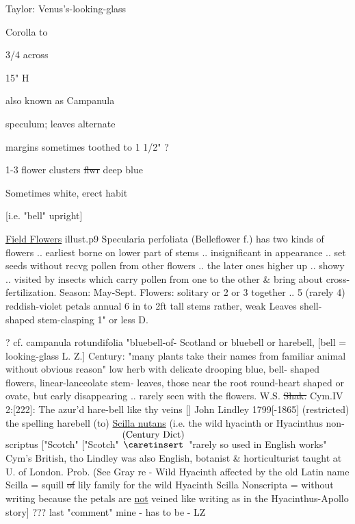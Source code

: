 \documentclass[a4paper]{article}
\begin{document}
\begin{minipage}[t]{0.6\textwidth}
Taylor: Venus's-looking-glass\par
Corolla to\par
3/4 across\par
15" H\par


also known as Campanula\par
speculum; leaves alternate\par
margins sometimes toothed to 1 1/2" ?\par
1-3 flower clusters \sout{flwr} deep blue\par
Sometimes white, erect habit\par
{[i.e. "bell" upright]}\par
\ul{Field Flowers} illust.p9 Specularia
perfoliata (Belleflower
f.)
has two kinds of flowers .. earliest
borne on lower part of stems .. insignificant
in appearance .. set seeds without recvg
pollen from other flowers .. the later ones
higher up .. showy .. visited by insects
which carry pollen from one to the other \& bring
about cross-fertilization. Season:
May-Sept. Flowers: solitary or 2 or 3
together .. 5 (rarely 4) reddish-violet petals
annual 6 in to 2ft tall stems rather,
weak Leaves shell-shaped stem-clasping
1" or less D.\par 
\color{red}
? cf. campanula rotundifolia "bluebell-of-
Scotland or bluebell or harebell,
[bell = looking-glass L. Z.] Century:
"many plants take their names from
familiar animal %
without obvious reason"
low herb with delicate drooping blue, bell-
shaped flowers, linear-lanceolate stem-
leaves, those near the root round-heart
shaped or ovate, but early disappearing
.. rarely seen with the flowers.
W.S. \sout{Shak.} Cym.IV 2:[222]: The azur'd hare-bell
like thy veins [] John Lindley 1799[-1865]
(restricted) the spelling harebell
(to) \ul{Scilla nutans} (i.e. the wild
hyacinth or Hyacinthus non-scriptus
["Scotch" 
["Scotch" 
\color{blue}
$\stackrel{\hbox{(Century Dict)}}{\hbox{$\caretinsert$}}$
\color{red}
"rarely so used in English
works" Cym's British, tho Lindley 
was also English, botanist \& horticulturist
taught at U. of London. Prob. (See
Gray re - Wild Hyacinth affected
by the old Latin name Scilla = squill
\sout{of} lily family for the wild Hyacinth
Scilla Nonscripta = without writing
because the petals are \ul{not} veined like
writing as in the Hyacinthus-Apollo story]
\color{blue}
??? last "comment" mine
- has to be - LZ
\end{minipage}
\end{document}

